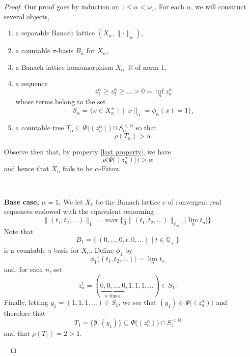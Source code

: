 \documentclass[10pt]{amsart}
\newcommand{\norm}[1]{\lVert#1\rVert}
\newcommand{\Norm}[1]{\big\lVert#1\big\rVert}
\newcommand{\Mgd}[2]{\big\{\,  {#1}\;\big|\; {#2} \,\big\} }
\newcommand{\maps}[1]{\mathop{\overset{#1}\longrightarrow}}
\newcommand {\1}{\mathbb 1}
\newcommand {\N}{\mathbb N}
\newcommand {\Q}{\mathbb Q}
\newcommand{\om}{\omega}
\newcommand{\tom} {\emptyset}
\newcommand {\del}{ \; \big| \;}
\theoremstyle{plain}
\theoremstyle{definition}
\begin{document}
\begin{proof}
Our proof goes by induction on $1\leqslant \alpha<\om_1$. For each $\alpha$, we will construct several objects,
\begin{enumerate}
    \item a separable Banach lattice $(X_\alpha,\norm{\cdot}_\alpha)$,
    \item a countable $\pi$-basis $B_\alpha$ for $X_\alpha$,
    \item a Banach lattice homomorphism $X_\alpha\maps{\phi_\alpha} \mathbb{R}$ of norm $1$,
    \item a sequence 
$$
z^\alpha_1\geqslant z^\alpha_2\geqslant  \ldots> 0=\inf_nz^\alpha_n
$$
whose terms belong to the set 
$$
S_\alpha=\big\{x\in X^+_\alpha\del \norm{x}_\alpha=\phi_\alpha(x)=1\big\},
$$
\item\label{last property} a countable tree $T_\alpha\subseteq \Psi\big((z^\alpha_n)\big)\cap S_\alpha^{<\N}$ so that
$$
\rho(T_\alpha)>\alpha.
$$
\end{enumerate}
Observe then that, by property \eqref{last property}, we have
$$
\rho\Big(\Psi\big((z^\alpha_n)\big)\Big)>{\alpha}
$$
and hence that $X_\alpha$ fails to be $\alpha$-Fatou.



\


{\bf Base case, $\alpha=1$.} We let $X_1$ be the Banach lattice  $c$ of convergent real sequences endowed with the equivalent renorming 
$$
\Norm{(t_1,t_2,\ldots)}_1 =\max\Big\{ \tfrac{1}{3}\Norm{(t_1,t_2,\ldots)}_{\ell_\infty},  \big|\lim_nt_n\big|\Big\}.
$$ 
Note that 
$$
B_1=\Mgd{(0,\ldots, 0,t,0,\ldots)}{t\in \Q_+}
$$
is a countable $\pi$-basis for $X_\alpha$.
Define $\phi_1$ by
$$
\phi_1\big((t_1,t_2,\ldots)\big) = \lim_n t_n
$$
and, for each $n$, set 
$$
z^1_n = (\underbrace{0,0,\ldots,0}_{n\text{ times}}, 1,1,1,\ldots) \in S_1.
$$ 
Finally, letting $y_1 = (1,1,1,\ldots)\in S_1$, we see that $(y_1)\in \Psi\big((z^\alpha_n)\big)$ and therefore that
$$
T_1=\big\{\tom, (y_1)\big\}\subseteq \Psi\big((z^\alpha_n)\big)\cap S_1^{<\N}
$$
and that $\rho(T_1)=2>1$.

\


\end{proof}
\end{document}
